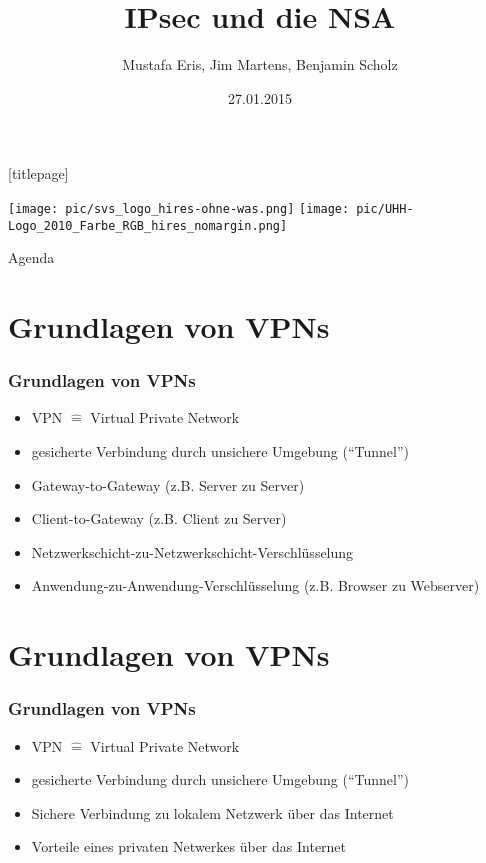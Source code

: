 \documentclass[t]{beamer}
\title{IPsec und die NSA}
\author[Eris, Martens, Scholz]{Mustafa Eris, Jim Martens, Benjamin Scholz}
\institute[Uni Hamburg]{Universität Hamburg\\ Fachbereich Informatik}
\date{27.01.2015}
\begin{document}
\begingroup
	[titlepage]
	\begin{frame}[plain]
		\vskip8mm
		\texttt{[image: pic/svs\_logo\_hires-ohne-was.png]}
		\vskip-20mm %
		\titlepage
		\vspace{\fill}
		\texttt{[image: pic/UHH-Logo\_2010\_Farbe\_RGB\_hires\_nomargin.png]}
		\vskip20pt
	\end{frame}
\endgroup

\begin{frame}{Agenda}
	\tableofcontents
\end{frame}

\section{Grundlagen von VPNs}
\begin{frame}
	\frametitle{Grundlagen von VPNs}
	\begin{itemize}
		\item VPN \(\widehat{=}\) Virtual Private Network
		\item gesicherte Verbindung durch unsichere Umgebung ("`Tunnel"')
		\item Gateway-to-Gateway (z.B. Server zu Server)
		\item Client-to-Gateway (z.B. Client zu Server)
		\item Netzwerkschicht-zu-Netzwerkschicht-Verschlüsselung
		\item Anwendung-zu-Anwendung-Verschlüsselung (z.B. Browser zu Webserver)
	\end{itemize}
\end{frame}

\section{Grundlagen von VPNs}
\begin{frame}
	\frametitle{Grundlagen von VPNs}
	\begin{itemize}
		\vfill
		\item VPN \(\widehat{=}\) Virtual Private Network
		\vfill
		\item gesicherte Verbindung durch unsichere Umgebung ("`Tunnel"')
		\vfill
		\item Sichere Verbindung zu lokalem Netzwerk über das Internet
		\vfill
		\item Vorteile eines privaten Netwerkes über das Internet
		\vfill
	\end{itemize}
\end{frame}
\end{document}
